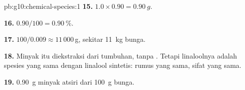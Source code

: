 \begin{solution}{pb:g10:chemical-species:1}
\textbf{15.} $1.0 \times 0.90 = \qty{0.90}{g}$.

\textbf{16.} $0.90/100 = \qty{0.90}{\percent}$.

\textbf{17.} $100/0.009 \approx 11\,000$\,g, sekitar \qty{11}{kg}
bunga.

\textbf{18.} Minyak itu diekstraksi dari tumbuhan, tanpa .
Tetapi linaloolnya adalah spesies yang sama dengan linalool sintetis:
rumus yang sama, sifat yang sama.

\textbf{19.} \qty{0.90}{g} minyak atsiri dari \qty{100}{g} bunga.
\end{solution}
